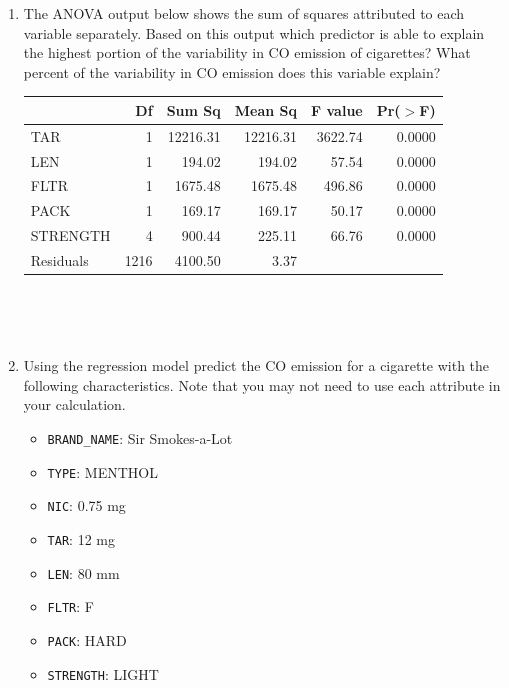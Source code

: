 \documentclass[12pt]{article}
\newcommand{\soln}[2]{$\:$\\ \vspace{#1}}{}
\begin{document}
\begin{enumerate}[resume]
\item The ANOVA output below shows the sum of squares attributed to each variable separately. Based on this output
which predictor is able to explain the highest portion of the variability in CO emission of cigarettes? What percent
of the variability in CO emission does this variable explain?

\begin{minipage}[c]{0.55\textwidth}
{\footnotesize
\begin{tabular}{lrrrrr}
  \hline
 & Df & Sum Sq & Mean Sq & F value & Pr($>$F) \\ 
  \hline
TAR & 1 & 12216.31 & 12216.31 & 3622.74 & 0.0000 \\ 
  LEN & 1 & 194.02 & 194.02 & 57.54 & 0.0000 \\ 
  FLTR & 1 & 1675.48 & 1675.48 & 496.86 & 0.0000 \\ 
  PACK & 1 & 169.17 & 169.17 & 50.17 & 0.0000 \\ 
  STRENGTH & 4 & 900.44 & 225.11 & 66.76 & 0.0000 \\ 
  Residuals & 1216 & 4100.50 & 3.37 &  &  \\ 
   \hline
\end{tabular}
}
\end{minipage}
\begin{minipage}[c]{0.4\textwidth}
$\:$ \\
\end{minipage}

\soln{3cm}{
$R^2_{TAR} = \frac{12216.31}{12216.31 + 194.02 + 1675.48 + 169.17 + 900.44 + 4100.50} \approx 0.63$
}

%

\item Using the regression model predict the CO emission for a cigarette with the following characteristics. Note that you 
may not need to use each attribute in your calculation.

\begin{multicols}{2}
\begin{itemize}
\item \texttt{BRAND\_NAME}: Sir Smokes-a-Lot
\item \texttt{TYPE}: MENTHOL
\item \texttt{NIC}: 0.75 mg
\item \texttt{TAR}: 12 mg
\item \texttt{LEN}: 80 mm
\item \texttt{FLTR}: F
\item \texttt{PACK}: HARD
\item \texttt{STRENGTH}: LIGHT
\end{itemize}
\end{multicols}


\end{enumerate}
\end{document}
